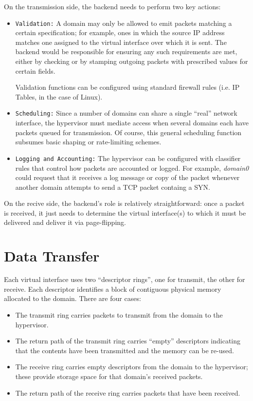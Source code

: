 \documentclass[11pt,twoside,final,openright]{xenstyle}
\begin{document}
On the transmission side, the backend needs to perform two key actions:
\begin{itemize}
\item {\tt Validation:} A domain may only be allowed to emit packets
matching a certain specification; for example, ones in which the
source IP address matches one assigned to the virtual interface over
which it is sent.  The backend would be responsible for ensuring any
such requirements are met, either by checking or by stamping outgoing
packets with prescribed values for certain fields.

Validation functions can be configured using standard firewall rules
(i.e. IP Tables, in the case of Linux).

\item {\tt Scheduling:} Since a number of domains can share a single
``real'' network interface, the hypervisor must mediate access when
several domains each have packets queued for transmission.  Of course,
this general scheduling function subsumes basic shaping or
rate-limiting schemes.

\item {\tt Logging and Accounting:} The hypervisor can be configured
with classifier rules that control how packets are accounted or
logged.  For example, {\it domain0} could request that it receives a
log message or copy of the packet whenever another domain attempts to
send a TCP packet containg a SYN.
\end{itemize}

On the recive side, the backend's role is relatively straightforward:
once a packet is received, it just needs to determine the virtual interface(s)
to which it must be delivered and deliver it via page-flipping. 


\section{Data Transfer}

Each virtual interface uses two ``descriptor rings'', one for transmit,
the other for receive.  Each descriptor identifies a block of contiguous
physical memory allocated to the domain.  There are four cases:

\begin{itemize}

\item The transmit ring carries packets to transmit from the domain to the
hypervisor.

\item The return path of the transmit ring carries ``empty'' descriptors
indicating that the contents have been transmitted and the memory can be
re-used.

\item The receive ring carries empty descriptors from the domain to the 
hypervisor; these provide storage space for that domain's received packets.

\item The return path of the receive ring carries packets that have been
received.
\end{itemize}
\end{document}
